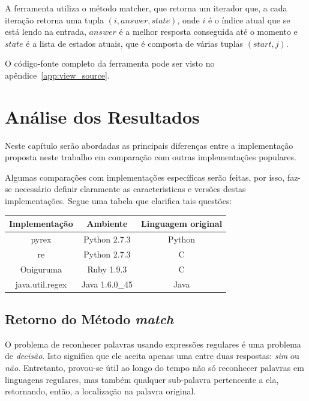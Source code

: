 \documentclass[a4paper,12pt,oneside,onecolumn]{uerj}
\begin{document}
A ferramenta utiliza o método matcher, que retorna um iterador que, a cada iteração retorna uma tupla $(i, answer, state)$, onde $i$ é o índice atual que se está lendo na entrada, $answer$ é a melhor resposta conseguida até o momento e $state$ é a lista de estados atuais, que é composta de várias tuplas $(start, j)$.

O código-fonte completo da ferramenta pode ser visto no apêndice~\ref{app:view_source}.

\chapter{Análise dos Resultados}\label{cap:analysis}

Neste capítulo serão abordadas as principais diferenças entre a implementação proposta neste trabalho em comparação com outras implementações populares.

Algumas comparações com implementações específicas serão feitas, por isso, faz-se necessário definir claramente as caracteristicas e versões destas implementações. Segue uma tabela que clarifica tais questões:

\begin{center}
	\begin{tabular}{ c | c | c }
		{\bf Implementação} & {\bf Ambiente} & {\bf Linguagem original} \\
		\hline 
		pyrex & Python 2.7.3 & Python \\
		re & Python 2.7.3 & C \\
		Oniguruma & Ruby 1.9.3 & C \\
		java.util.regex & Java 1.6.0\_45 & Java \\
	\end{tabular}
\end{center}


\section{Retorno do Método \emph{match}}

O problema de reconhecer palavras usando expressões regulares é uma problema de \emph{decisão}. Isto significa que ele aceita apenas uma entre duas respostas: \emph{sim} ou \emph{não}. Entretanto, provou-se útil ao longo do tempo não só reconhecer palavras em linguagens regulares, mas também qualquer sub-palavra pertencente a ela, retornando, então, a localização na palavra original.
\end{document}
